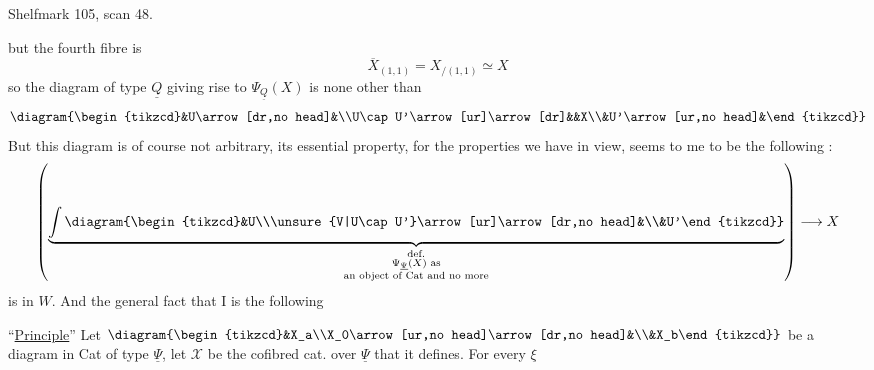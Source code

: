 Shelfmark 105, scan 48.

but the fourth fibre is
\[\overline X_{(1,1)}=X_{/(1,1)}\simeq X\]
so the diagram  of type $\underline Q$ giving rise to $\Psi_{\underline Q}(X)$ is none other than
\[\diagram{\begin{tikzcd}&U\arrow[dr,no head]&\\U\cap U'\arrow[ur]\arrow[dr]&&X\\&U'\arrow[ur,no head]&\end{tikzcd}}\]
But this diagram  is of course not arbitrary, its essential property, for the properties we have in view, seems to me to be the following :
\[\left(\underbrace{\int\diagram{\begin{tikzcd}&U\\\unsure{V|U\cap U'}\arrow[ur]\arrow[dr,no head]&\\&U'\end{tikzcd}}}_{\substack{\text{def.}\\\Psi_{\underline\Psi}(X)\text{ as}\\\text{an object of Cat and no more}}}\right)\longrightarrow X\]
is in $W$. And the general fact that I  is the following

``\uline{Principle}''  Let $\diagram{\begin{tikzcd}&X_a\\X_0\arrow[ur,no head]\arrow[dr,no head]&\\&X_b\end{tikzcd}}$ be a diagram in Cat of type $\underline\Psi$, let $\mathcal X$ be the cofibred cat. over $\underline\Psi$ that it defines. For every $\xi$
